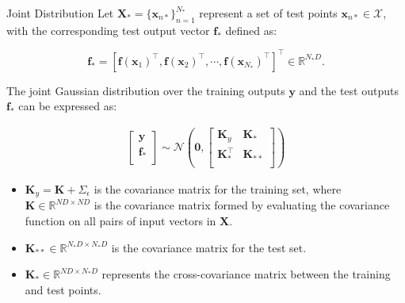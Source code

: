 \begin{frame}{Joint Distribution}
	\justifying
	Let $\mathbf{X}_* = \{\bm{x}_{n*}\}_{n=1}^{N_*}$ represent a set of test points $\bm{x}_{n*} \in \mathcal{X}$, with the corresponding test output vector $\mathbf{f}_*$ defined as:
	
	\[
	\mathbf{f}_* = [\bm{f}(\bm{x}_1)^\top, \bm{f}(\bm{x}_2)^\top, \cdots, \bm{f}(\bm{x}_{N_*})^\top]^\top \in \mathbb{R}^{N_* D}.
	\]
	
	\vspace{2mm}
	The joint Gaussian distribution over the training outputs $\mathbf{y}$ and the test outputs $\mathbf{f}_*$ can be expressed as:
	
	\begin{equation*}\label{sogp_prior_matrix}
		\begin{array}{rcl}
			\left[ \begin{array}{c}
				\mathbf{y}\\
				\mathbf{f_*}\\
			\end{array}
			\right]
			\sim
			\mathcal{N} \left(
			\bm{0},
			\left[ \begin{array}{cc}
				\mathbf{K}_y & \mathbf{K}_*\\
				\mathbf{K}_*^\top & \mathbf{K}_{**}\\
			\end{array}
			\right] \right)
		\end{array}
	\end{equation*}
	
	\vspace{3mm}
	\begin{itemize}
		\item $\mathbf{K}_y = \mathbf{K} + \Sigma_\epsilon$ is the covariance matrix for the training set, where $\mathbf{K} \in \mathbb{R}^{ND \times ND}$ is the covariance matrix formed by evaluating the covariance function on all pairs of input vectors in $\mathbf{X}$.
		
		\item $\mathbf{K}_{**} \in \mathbb{R}^{N_* D \times N_* D}$ is the covariance matrix for the test set.
		
		\item $\mathbf{K}_* \in \mathbb{R}^{ND \times N_* D}$ represents the cross-covariance matrix between the training and test points.
	\end{itemize}
\end{frame}


